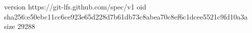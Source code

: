 version https://git-lfs.github.com/spec/v1
oid sha256:e50ebc11cc6ce923e65d228d7b61db73c8abea70c8ef6c1dcee5521c9fd10a3a
size 29288
